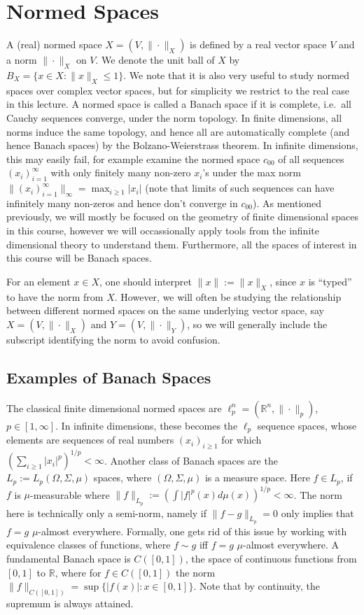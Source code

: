 \documentclass[11pt]{article}
\theoremstyle{plain}
\theoremstyle{plain}
\newcommand{\set}[1]{\{{#1}\}}
\newcommand{\R}{\ensuremath{\mathbb{R}}}
\begin{document}
\section{Normed Spaces}

A (real) normed space $X = (V,\|\cdot\|_X)$ is defined by a real vector space
$V$ and a norm $\|\cdot\|_X$ on $V$.  We denote the unit ball of $X$ by $B_X =
\set{x \in X: \|x\|_X \leq 1}$. We note that it is also very useful to study
normed spaces over complex vector spaces, but for simplicity we restrict to the
real case in this lecture. A normed space is called a Banach space if it is
complete, i.e.~all Cauchy sequences converge, under the norm topology. In finite
dimensions, all norms induce the same topology, and hence all are automatically
complete (and hence Banach spaces) by the Bolzano-Weierstrass theorem. In
infinite dimensions, this may easily fail, for example examine the normed space
$c_{00}$ of all sequences $(x_i)_{i=1}^\infty$ with only finitely many non-zero
$x_i$'s under the max norm $\|(x_i)_{i=1}^\infty\|_\infty = \max_{i \geq 1}
|x_i|$ (note that limits of such sequences can have infinitely many non-zeros
and hence don't converge in $c_{00}$). As mentioned previously, we will mostly
be focused on the geometry of finite dimensional spaces in this course, however
we will occassionally apply tools from the infinite dimensional theory to
understand them. Furthermore, all the spaces of interest in this course will be
Banach spaces. 

For an element $x \in X$, one should interpret $\|x\| := \|x\|_X$, since $x$ is
``typed'' to have the norm from $X$. However, we will often be studying the
relationship between different normed spaces on the same underlying vector
space, say $X=(V,\|\cdot\|_X)$ and $Y=(V,\|\cdot\|_Y)$, so we will generally
include the subscript identifying the norm to avoid confusion. 

\subsection{Examples of Banach Spaces} 
The classical finite dimensional normed spaces are $\ell_p^n = (\R^n,
\|\cdot\|_p)$, $p \in [1,\infty]$. In infinite dimensions, these becomes the
$\ell_p$ sequence spaces, whose elements are sequences of real numbers $(x_i)_{i
\geq 1}$ for which $(\sum_{i \geq 1} |x_i|^p)^{1/p} < \infty$. Another class of
Banach spaces are the $L_p := L_p(\Omega,\Sigma,\mu)$ spaces, where
$(\Omega,\Sigma,\mu)$ is a measure space. Here $f \in L_p$, if $f$ is
$\mu$-measurable where $\|f\|_{L_p} := (\int |f|^p(x) d\mu(x))^{1/p} < \infty$.
The norm here is technically only a semi-norm, namely if $\|f-g\|_{L_p} = 0$
only implies that $f=g$ $\mu$-almost everywhere. Formally, one gets rid of this
issue by working with equivalence classes of functions, where $f \sim g$ iff
$f=g$ $\mu$-almost everywhere. A fundamental Banach space is $C([0,1])$, the space of
continuous functions from $[0,1]$ to $\R$, where for $f \in C([0,1])$ the norm
$\|f\|_{C([0,1])} = \sup \set{|f(x)|: x \in [0,1]}$. Note that by continuity, the
supremum is always attained.  
\end{document}
